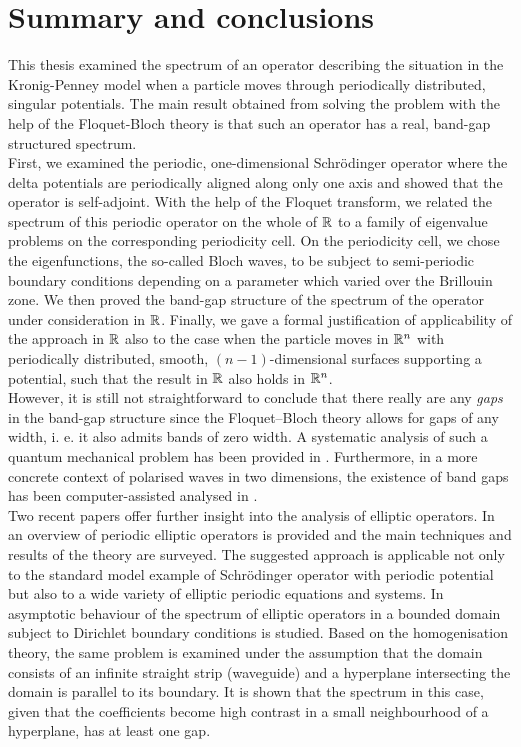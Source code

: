 \chapter{Summary and conclusions} \label{chap:8} %
	
This thesis examined the spectrum of an operator describing the situation in the Kronig-Penney model when a particle moves through periodically distributed, singular potentials. The main result obtained from solving the problem with the help of the Floquet-Bloch theory is that such an operator has a real, band-gap structured spectrum.
~\\

First, we examined the periodic, one-dimensional Schrödinger operator where the delta potentials are periodically aligned along only one axis and showed that the operator is self-adjoint. With the help of the Floquet transform, we related the spectrum of this periodic operator on the whole of $\mathbb{R}$ to a family of eigenvalue problems on the corresponding periodicity cell. On the periodicity cell, we chose the eigenfunctions, the so-called Bloch waves, to be subject to semi-periodic boundary conditions depending on a parameter which varied over the Brillouin zone. We then proved the band-gap structure of the spectrum of the operator under consideration in $\mathbb{R}$. Finally, we gave a formal justification of applicability of the approach in $\mathbb{R}$ also to the case when the particle moves in $\mathbb{R}^{n}$ with periodically distributed, smooth, $(n-1)$-dimensional surfaces supporting a potential, such that the result in $\mathbb{R}$ also holds in $\mathbb{R}^{n}$. 
~\\

However, it is still not straightforward to conclude that there really are any \textit{gaps} in the band-gap structure since the Floquet–Bloch theory allows for gaps of any width, i. e. it also admits bands of zero width. A systematic analysis of such a quantum mechanical problem has been provided in \cite{albeverio2012solvable}. Furthermore, in a more concrete context of polarised waves in two dimensions, the existence of band gaps has been computer-assisted analysed in \cite{hoang2009computer}. 
~\\

Two recent papers offer further insight into the analysis of elliptic operators. In \cite{kuchment2016overview} an overview of periodic elliptic operators is provided and the main techniques and results of the theory are surveyed. The suggested approach is applicable not only to the standard model example of Schrödinger operator with periodic potential but also to a wide variety of elliptic periodic equations and systems. In \cite{khrabustovskyi2016spectral} asymptotic behaviour of the spectrum of elliptic operators in a bounded domain subject to Dirichlet boundary conditions is studied. Based on the homogenisation theory, the same problem is examined under the assumption that the domain consists of an infinite straight strip (waveguide) and a hyperplane intersecting the domain is parallel to its boundary. It is shown that the spectrum in this case, given that the coefficients become high contrast in a small neighbourhood of a hyperplane, has at least one gap.